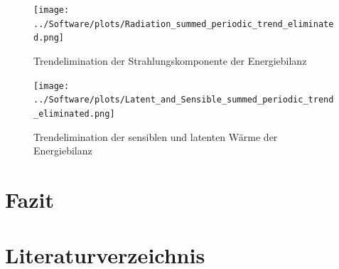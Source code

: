 \documentclass[12pt,a4paper]{article}
\begin{document}
\begin{figure}[H]
\centering
\texttt{[image: ../Software/plots/Radiation\_summed\_periodic\_trend\_eliminated.png]}
\caption{Trendelimination der Strahlungskomponente der Energiebilanz}
\label{fig:Trendelimination der Strahlungskomponente der Energiebilanz}
\end{figure}

\begin{figure}[H]
\centering
\texttt{[image: ../Software/plots/Latent\_and\_Sensible\_summed\_periodic\_trend\_eliminated.png]}
\caption{Trendelimination der sensiblen und latenten Wärme der Energiebilanz}
\label{fig:Trendelimination der sensiblen und latenten Wärme der Energiebilanz}
\end{figure}






\pagebreak
\section{Fazit}


\pagebreak
\section{Literaturverzeichnis}
\printbibliography


%
%
%
\end{document}
